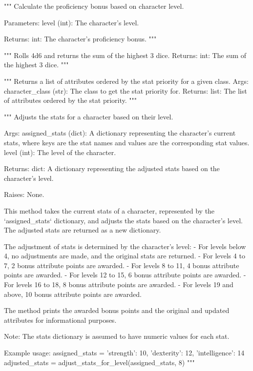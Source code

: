 \begin{codebox}
"""
Calculate the proficiency bonus based on character level.

Parameters:
    level (int): The character's level.

Returns:
    int: The character's proficiency bonus.
"""
\end{codebox}

\begin{codebox}
"""
Rolls 4d6 and returns the sum of the highest 3 dice.
Returns:
    int: The sum of the highest 3 dice.
"""
\end{codebox}

\begin{codebox}
"""
Returns a list of attributes ordered by the stat priority for a given class.
Args:
    character_class (str): The class to get the stat priority for.
Returns:
    list: The list of attributes ordered by the stat priority.
"""
\end{codebox}

\begin{codebox}
"""
Adjusts the stats for a character based on their level.

Args:
    assigned_stats (dict): A dictionary representing the character's current stats, where keys are
        the stat names and values are the corresponding stat values.
    level (int): The level of the character.

Returns:
    dict: A dictionary representing the adjusted stats based on the character's level.

Raises:
    None.

This method takes the current stats of a character, represented by the `assigned_stats` dictionary,
and adjusts the stats based on the character's level. The adjusted stats are returned as a new dictionary.

The adjustment of stats is determined by the character's level:
 - For levels below 4, no adjustments are made, and the original stats are returned.
 - For levels 4 to 7, 2 bonus attribute points are awarded.
 - For levels 8 to 11, 4 bonus attribute points are awarded.
 - For levels 12 to 15, 6 bonus attribute points are awarded.
 - For levels 16 to 18, 8 bonus attribute points are awarded.
 - For levels 19 and above, 10 bonus attribute points are awarded.

The method prints the awarded bonus points and the original and updated attributes for informational purposes.

Note: The stats dictionary is assumed to have numeric values for each stat.

Example usage:
    assigned_stats = {'strength': 10, 'dexterity': 12, 'intelligence': 14}
    adjusted_stats = adjust_stats_for_level(assigned_stats, 8)
"""
\end{codebox}

